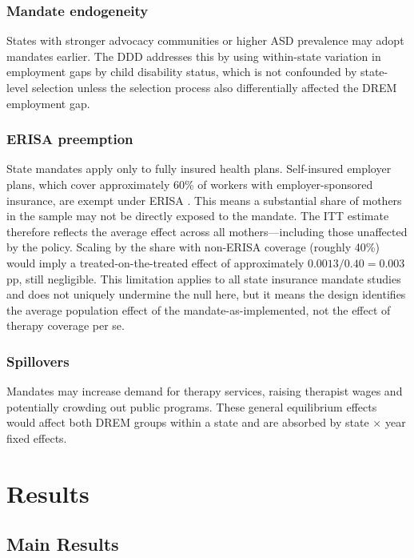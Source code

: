 \documentclass[12pt]{article}
\begin{document}
\subsubsection*{Mandate endogeneity}  States with stronger advocacy communities or higher ASD prevalence may adopt mandates earlier. The DDD addresses this by using within-state variation in employment gaps by child disability status, which is not confounded by state-level selection unless the selection process also differentially affected the DREM employment gap.

\subsubsection*{ERISA preemption}  State mandates apply only to fully insured health plans. Self-insured employer plans, which cover approximately 60\% of workers with employer-sponsored insurance, are exempt under ERISA \citep{gruber1994}. This means a substantial share of mothers in the sample may not be directly exposed to the mandate. The ITT estimate therefore reflects the average effect across all mothers---including those unaffected by the policy. Scaling by the share with non-ERISA coverage (roughly 40\%) would imply a treated-on-the-treated effect of approximately $0.0013 / 0.40 = 0.003$pp, still negligible. This limitation applies to all state insurance mandate studies and does not uniquely undermine the null here, but it means the design identifies the average population effect of the mandate-as-implemented, not the effect of therapy coverage per se.

\subsubsection*{Spillovers}  Mandates may increase demand for therapy services, raising therapist wages and potentially crowding out public programs. These general equilibrium effects would affect both DREM groups within a state and are absorbed by state $\times$ year fixed effects.


\section{Results}

\subsection{Main Results}


\end{document}
